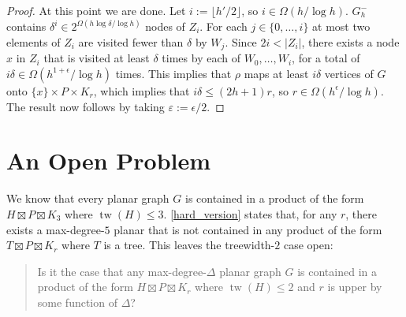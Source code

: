 \documentclass{patmorin}
\DeclareMathOperator{\tw}{tw}
\begin{document}
\begin{proof}
  At this point we are done.  Let $i:=\lfloor h'/2\rfloor$, so $i\in\Omega(h/\log h)$.  $G_h^-$ contains $\delta^i \in 2^{\Omega(h\log\delta/\log h)}$  nodes of $Z_i$.  For each $j\in\{0,\ldots,i\}$ at most two elements of $Z_i$ are visited fewer than $\delta$ by $W_j$.  Since $2i < |Z_i|$, there exists a node $x$ in $Z_i$ that is visited at least $\delta$ times by each of $W_0,\ldots,W_i$, for a total of $i\delta \in \Omega(h^{1+\epsilon}/\log h)$ times. This implies that $\rho$ maps at least $i\delta$ vertices of $G$ onto $\{x \}\times P\times K_r$, which implies that $i\delta\le (2h+1)r$, so $r\in\Omega(h^\epsilon/\log h)$.  The result now follows by taking $\varepsilon := \epsilon/2$.
\end{proof}


\section{An Open Problem}

We know that every planar graph $G$ is contained in a product of the form $H\boxtimes P\boxtimes K_3$ where $\tw(H)\le 3$. \cref{hard_version} states that, for any $r$, there exists a max-degree-$5$ planar that is not contained in any product of the form $T\boxtimes P\boxtimes K_r$ where $T$ is a tree.  This leaves the treewidth-$2$ case open:

\begin{quote}
  Is it the case that any max-degree-$\Delta$ planar graph $G$ is contained in a product of the form $H\boxtimes P\boxtimes K_r$ where $\tw(H)\le 2$ and $r$ is upper by some function of $\Delta$?
\end{quote}



\end{document}

